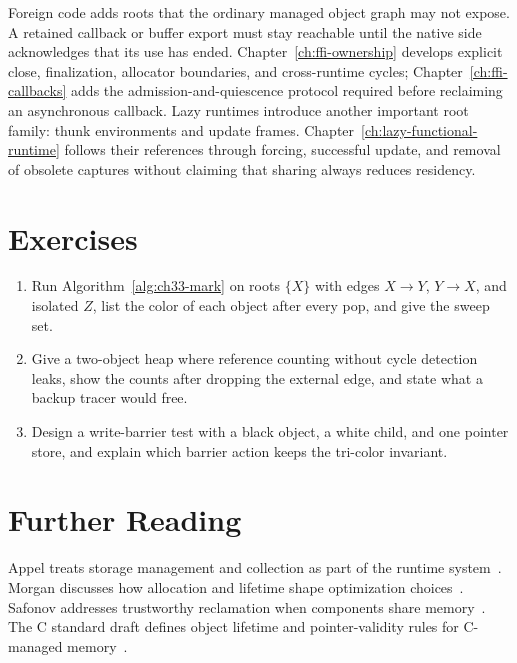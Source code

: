 Foreign code adds roots that the ordinary managed object graph may not expose.
A retained callback or buffer export must stay reachable until the native side acknowledges that its use has ended.
Chapter~\ref{ch:ffi-ownership} develops explicit close, finalization, allocator boundaries, and cross-runtime cycles; Chapter~\ref{ch:ffi-callbacks} adds the admission-and-quiescence protocol required before reclaiming an asynchronous callback.
Lazy runtimes introduce another important root family: thunk environments and update frames.
Chapter~\ref{ch:lazy-functional-runtime} follows their references through forcing, successful update, and removal of obsolete captures without claiming that sharing always reduces residency.

\section{Exercises}\label{sec:ch33-exercises}

\begin{enumerate}
\item Run Algorithm~\ref{alg:ch33-mark} on roots $\{X\}$ with edges $X \to Y$, $Y \to X$, and isolated $Z$, list the color of each object after every pop, and give the sweep set.\label{ex:ch33-cycle-trace}
\item Give a two-object heap where reference counting without cycle detection leaks, show the counts after dropping the external edge, and state what a backup tracer would free.\label{ex:ch33-count-leak}
\item Design a write-barrier test with a black object, a white child, and one pointer store, and explain which barrier action keeps the tri-color invariant.\label{ex:ch33-barrier-test}
\end{enumerate}

\section{Further Reading}\label{sec:ch33-reading}

Appel treats storage management and collection as part of the runtime system~\cite{appel-1998-modern}.
Morgan discusses how allocation and lifetime shape optimization choices~\cite{morgan-1998-optimizing}.
Safonov addresses trustworthy reclamation when components share memory~\cite{safonov-2010-trustworthy}.
The C standard draft defines object lifetime and pointer-validity rules for C-managed memory~\cite{wg14-2011-c11}.
